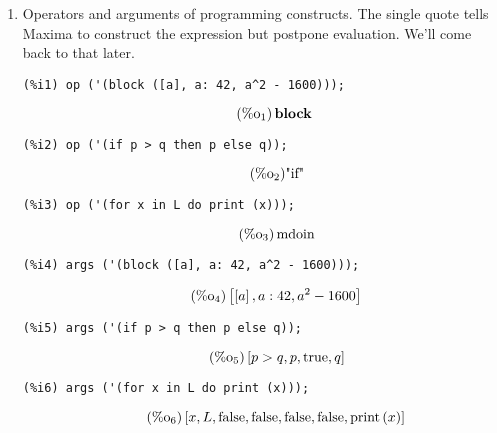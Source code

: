 \documentclass[12pt,leqno]{article}
\begin{document}
\begin{enumerate}
\item Operators and arguments of programming constructs.
The single quote tells Maxima to construct the expression but postpone evaluation.
We'll come back to that later.
\begin{verbatim}
(%i1) op ('(block ([a], a: 42, a^2 - 1600)));
\end{verbatim}
\begin{equation}
\tag{$\mathop{\mathrm{\%o}}_{1}$}\mathop\mathbf{block}\
\label{eq:doc-group1-code11-1-1}
\end{equation}
\begin{verbatim}
(%i2) op ('(if p > q then p else q));
\end{verbatim}
\begin{equation}
\tag{$\mathop{\mathrm{\%o}}_{2}$}\mbox{"if"}
\label{eq:doc-group1-code11-2-1}
\end{equation}
\begin{verbatim}
(%i3) op ('(for x in L do print (x)));
\end{verbatim}
\begin{equation}
\tag{$\mathop{\mathrm{\%o}}_{3}$}\mathop{\mathrm{mdoin}}
\label{eq:doc-group1-code11-3-1}
\end{equation}
\begin{verbatim}
(%i4) args ('(block ([a], a: 42, a^2 - 1600)));
\end{verbatim}
\begin{equation}
\tag{$\mathop{\mathrm{\%o}}_{4}$}\left[\left[a\right], a : 42, {a}^{2}-1600\right]
\label{eq:doc-group1-code11-4-1}
\end{equation}
\begin{verbatim}
(%i5) args ('(if p > q then p else q));
\end{verbatim}
\begin{equation}
\tag{$\mathop{\mathrm{\%o}}_{5}$}\left[p > q, p, \mathop{\mathrm{true}}, q\right]
\label{eq:doc-group1-code11-5-1}
\end{equation}
\begin{verbatim}
(%i6) args ('(for x in L do print (x)));
\end{verbatim}
\begin{equation}
\tag{$\mathop{\mathrm{\%o}}_{6}$}\left[x, L, \mathop{\mathrm{false}}, \mathop{\mathrm{false}}, \mathop{\mathrm{false}}, \mathop{\mathrm{false}}, \mathop{\mathrm{print}}\left(x\right)\right]
\label{eq:doc-group1-code11-6-1}
\end{equation}


\end{enumerate}
\end{document}
